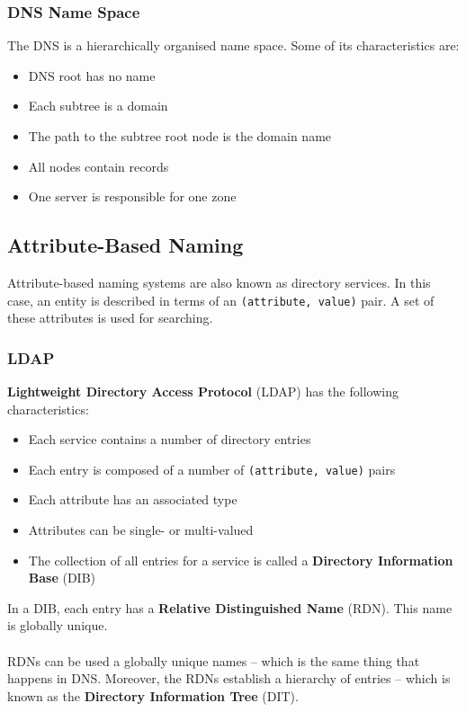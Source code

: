 \documentclass{article}
\begin{document}
\subsubsection{DNS Name Space}
The DNS is a hierarchically organised name space. Some of its characteristics are:

\begin{itemize}
	\item DNS root has no name
	\item Each subtree is a domain
	\item The path to the subtree root node is the domain name
	\item All nodes contain records
	\item One server is responsible for one zone
\end{itemize}

\subsection{Attribute-Based Naming}
Attribute-based naming systems are also known as directory services. In this case, an entity is described in terms of an \verb|(attribute, value)| pair. A set of these attributes is used for searching.

\subsubsection{LDAP}
\textbf{Lightweight Directory Access Protocol} (LDAP) has the following characteristics:

\begin{itemize}
	\item Each service contains a number of directory entries
	\item Each entry is composed of a number of \verb|(attribute, value)| pairs
	\item Each attribute has an associated type
	\item Attributes can be single- or multi-valued
	\item The collection of all entries for a service is called a \textbf{Directory Information Base} (DIB)
\end{itemize}

\noindent In a DIB, each entry has a \textbf{Relative Distinguished Name} (RDN). This name is globally unique. \\ \\
RDNs can be used a globally unique names -- which is the same thing that happens in DNS. Moreover, the RDNs establish a hierarchy of entries -- which is known as the \textbf{Directory Information Tree} (DIT).
\end{document}
